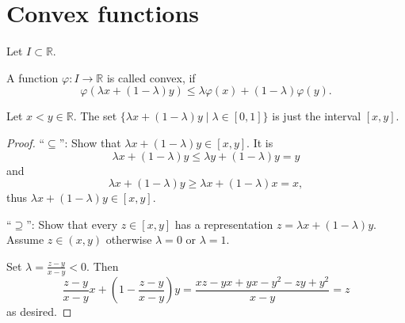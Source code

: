 \documentclass{scrreprt}
\begin{document}
\section{Convex functions}

Let $I \subset \mathbb{R}$.

\begin{definition}
  A function $\varphi: I \to \mathbb{R}$ is called convex, if
  \[
  \varphi (\lambda x + (1-\lambda)y) \leq \lambda \varphi(x) + (1-\lambda) \varphi(y).
  \]
\end{definition}

\begin{proposition}
Let $x < y \in \mathbb{R}$. The set $\{\lambda x + (1-\lambda)y \mid \lambda \in [0,1]\}$ is just the interval $[x,y]$. 
\end{proposition}

\begin{proof}
  ``$\subseteq$'': Show that $\lambda x + (1-\lambda)y \in [x,y]$. It is
  \[
  \lambda x + (1-\lambda)y \leq \lambda y + (1-\lambda)y = y
  \] 
  and
  \[
  \lambda x + (1-\lambda)y \geq \lambda x + (1-\lambda) x = x,
  \]
  thus $\lambda x + (1-\lambda)y \in [x,y]$.
  
  ``$\supseteq$'': Show that every $z \in [x,y]$ has a representation $z=\lambda x + (1-\lambda)y$. Assume $z \in (x,y)$ otherwise $\lambda=0$ or $\lambda=1$.

  Set $\lambda=\frac{z-y}{x-y} < 0$. Then
  \[
  \frac{z-y}{x-y} x + (1- \frac{z-y}{x-y}) y = \frac{xz-yx+yx-y^2-zy+y^2}{x-y} = z
  \]
  as desired.
  
\end{proof}
\end{document}
